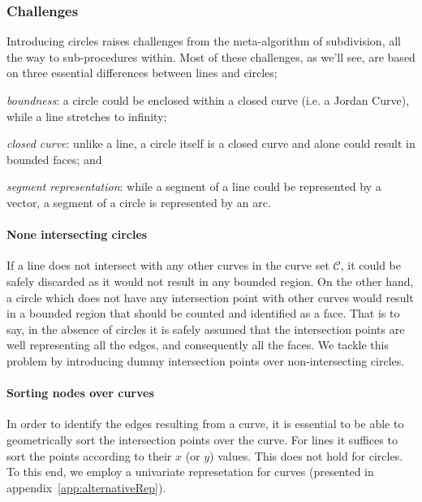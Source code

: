 \subsubsection{Challenges}

Introducing circles raises challenges from the meta-algorithm of subdivision, all the way to sub-procedures within.
Most of these challenges, as we'll see, are based on three essential differences between lines and circles;
\begin{inparaenum}
  \item \emph{boundness}: a circle could be enclosed within a closed curve (i.e. a Jordan Curve), while a line stretches to infinity;
  \item \emph{closed curve}: unlike a line, a circle itself is a closed curve and alone could result in bounded faces; and 
  \item \emph{segment representation}: while a segment of a line could be represented by a vector, a segment of a circle is represented by an arc.
\end{inparaenum}


\paragraph{None intersecting circles}
If a line does not intersect with any other curves in the curve set $\mathcal{C}$, it could be safely discarded as it would not result in any bounded region.
On the other hand, a circle which does not have any intersection point with other curves would result in a bounded region that should be counted and identified as a face.
That is to say, in the absence of circles it is safely assumed that the intersection points are well representing all the edges, and consequently all the faces.
We tackle this problem by introducing dummy intersection points over non-intersecting circles.

\paragraph{Sorting nodes over curves}
In order to identify the edges resulting from a curve, it is essential to be able to geometrically sort the intersection points over the curve.
For lines it suffices to sort the points according to their $x$ (or $y$) values.
This does not hold for circles.
To this end, we employ a univariate represetation for curves (presented in appendix~\ref{app:alternativeRep}).

